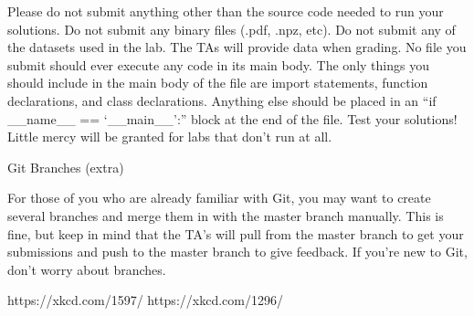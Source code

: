 Please do not submit anything other than the source code needed to run your solutions.
Do not submit any binary files (.pdf, .npz, etc).
Do not submit any of the datasets used in the lab. The TAs will provide data when grading.
No file you submit should ever execute any code in its main body. The only things you should include in the main body of the file are import statements, function declarations, and class declarations. Anything else should be placed in an ``if \_\_name\_\_ == ‘\_\_main\_\_':'' block at the end of the file.
Test your solutions! Little mercy will be granted for labs that don't run at all.

Git Branches (extra)

For those of you who are already familiar with Git, you may want to create several branches and merge them in with the master branch manually. This is fine, but keep in mind that the TA's will pull from the master branch to get your submissions and push to the master branch to give feedback. If you're new to Git, don't worry about branches.


https://xkcd.com/1597/
https://xkcd.com/1296/
